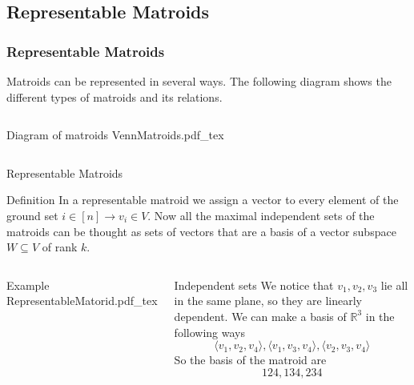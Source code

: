 \documentclass{beamer}
\newcommand{\incfig}[1]{%
\center
\def\svgwidth{0.9\columnwidth}
{#1.pdf_tex}
}
\begin{document}
\subsection{Representable Matroids}
\begin{frame}
\frametitle{Representable Matroids}
Matroids can be represented in several ways. The following diagram shows the different types of matroids and its relations.
\begin{columns}[c]
\begin{block}{Diagram of matroids}
\incfig{VennMatroids}
\end{block}
\end{columns}
\end{frame}

\begin{frame}{Representable Matroids}
\begin{block}{Definition}
  In a representable matroid we assign a vector to every element of the ground set $i\in [n] \to  v_i \in V$. Now all the maximal independent sets of the matroids can be thought as sets of vectors that are a basis of a vector subspace $W\subseteq V$ of rank $k$.
\end{block} 
\begin{columns}[c]
\begin{block}{Example}
\incfig{RepresentableMatorid}
\end{block}
\begin{block}{Independent sets}
We notice that $v_1, v_2, v_3$ lie all in the same plane, so they are linearly dependent.
We can make a basis of $\mathbb{R}^3$ in the following ways
\[
\langle v_1, v_2, v_4 \rangle , 
\langle v_1, v_3, v_4 \rangle ,
\langle v_2, v_3, v_4 \rangle
\] 
So the basis of the matroid are
\[
  124, 134, 234
\] 
\end{block}
\end{columns}
\end{frame}
\end{document}
